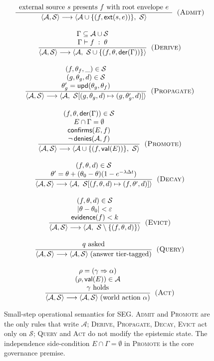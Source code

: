 \documentclass[11pt]{article}
\theoremstyle{plain}
\theoremstyle{definition}
\newcommand{\Aut}{\mathcal{A}}
\newcommand{\Soft}{\mathcal{S}}
\newcommand{\ext}{\mathsf{ext}}
\newcommand{\der}{\mathsf{der}}
\newcommand{\val}{\mathsf{val}}
\newcommand{\reduces}{\longrightarrow}
\newcommand{\confff}{\theta}
\newcommand{\irule}[3]{\dfrac{\begin{array}{c}#2\end{array}}{#3}\;\;\textsc{(#1)}}
\begin{document}
\begin{figure}[t]
\footnotesize
\begin{gather*}
\irule{Admit}{\text{external source } s \text{ presents } f \text{ with root envelope } e}
  {\langle \Aut,\Soft\rangle \reduces \langle \Aut\cup\{(f,\ext(s,e))\},\ \Soft\rangle}
\\[9pt]
\irule{Derive}{\Gamma \subseteq \Aut\cup\Soft \\ \Gamma \vdash f \;:\; \confff}
  {\langle \Aut,\Soft\rangle \reduces \langle \Aut,\ \Soft\cup\{(f,\confff,\der(\Gamma))\}\rangle}
\\[9pt]
\irule{Propagate}{(f,\confff_f,\_)\in\Soft \\ (g,\confff_g,d)\in\Soft \\ \confff_g' = \mathsf{upd}(\confff_g,\confff_f)}
  {\langle \Aut,\Soft\rangle \reduces \langle \Aut,\ \Soft[(g,\confff_g,d)\mapsto(g,\confff_g',d)]\rangle}
\\[9pt]
\irule{Promote}{(f,\confff,\der(\Gamma))\in\Soft \\ E\cap\Gamma=\emptyset \\
   \mathsf{confirms}(E,f) \\ \neg\,\mathsf{denies}(\Aut,f)}
  {\langle \Aut,\Soft\rangle \reduces \langle \Aut\cup\{(f,\val(E))\},\ \Soft\rangle}
\\[9pt]
\irule{Decay}{(f,\confff,d)\in\Soft \\ \confff' = \confff+(\confff_0-\confff)(1-e^{-\lambda\Delta t})}
  {\langle \Aut,\Soft\rangle \reduces \langle \Aut,\ \Soft[(f,\confff,d)\mapsto(f,\confff',d)]\rangle}
\\[9pt]
\irule{Evict}{(f,\confff,d)\in\Soft \\ |\confff-\confff_0|<\varepsilon \\ \mathsf{evidence}(f)<k}
  {\langle \Aut,\Soft\rangle \reduces \langle \Aut,\ \Soft\setminus\{(f,\confff,d)\}\rangle}
\\[9pt]
\irule{Query}{q \text{ asked}}
  {\langle \Aut,\Soft\rangle \reduces \langle \Aut,\Soft\rangle \;\text{(answer tier-tagged)}}
\\[9pt]
\irule{Act}{\rho=(\gamma\Rightarrow\alpha) \\ (\rho,\val(E))\in\Aut \\ \gamma \text{ holds}}
  {\langle \Aut,\Soft\rangle \reduces \langle \Aut,\Soft\rangle \;\text{(world action } \alpha)}
\end{gather*}
\caption{Small-step operational semantics for SEG. \textsc{Admit} and
\textsc{Promote} are the only rules that write $\Aut$; \textsc{Derive},
\textsc{Propagate}, \textsc{Decay}, \textsc{Evict} act only on $\Soft$;
\textsc{Query} and \textsc{Act} do not modify the epistemic state. The
independence side-condition $E\cap\Gamma=\emptyset$ in \textsc{Promote} is the
core governance premise.}
\label{fig:rules}
\end{figure}
\end{document}
